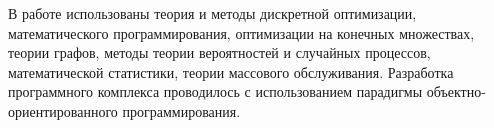 
{\methods} В работе использованы теория и методы дискретной оптимизации, математического программирования, оптимизации на конечных множествах, теории графов, методы теории вероятностей и случайных процессов, математической статистики, теории массового обслуживания. Разработка программного комплекса проводилось с использованием парадигмы объектно-ориентированного программирования.

{}

